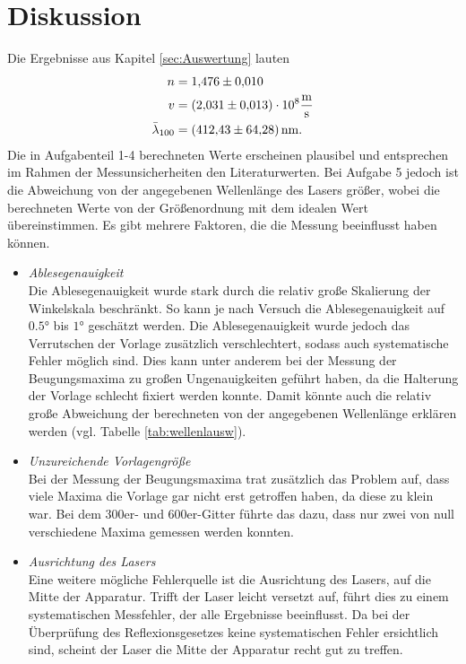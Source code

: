 \section{Diskussion}
\label{sec:Diskussion}
Die Ergebnisse aus Kapitel \ref{sec:Auswertung} lauten
\begin{align*}
    n &= \num{1.476 \pm 0.010} \\
    v &=(\num{2.031 \pm 0.013}) \cdot 10^8 \si{\metre\per\second}\\ 
    \bar{\lambda}_{100} &= \SI{412.43 \pm 64.28}{\nano\metre}.
\end{align*}
\noindent
Die in Aufgabenteil 1-4 berechneten Werte erscheinen plausibel und entsprechen im Rahmen der Messunsicherheiten
den Literaturwerten. Bei Aufgabe 5 jedoch ist die Abweichung von der angegebenen Wellenlänge des Lasers größer,
wobei die berechneten Werte von der Größenordnung mit dem idealen Wert übereinstimmen.
Es gibt mehrere Faktoren, die die Messung beeinflusst haben können.
\begin{itemize}
    \item \textit{Ablesegenauigkeit}
    \\\noindent
        Die Ablesegenauigkeit wurde stark durch die relativ große Skalierung der Winkelskala beschränkt.
        So kann je nach Versuch die Ablesegenauigkeit auf $\num{0.5}°$ bis $\num{1}°$ geschätzt werden.
        Die Ablesegenauigkeit wurde jedoch das Verrutschen der Vorlage zusätzlich verschlechtert, sodass
        auch systematische Fehler möglich sind. Dies kann unter anderem bei der Messung der Beugungsmaxima
        zu großen Ungenauigkeiten geführt haben, da die Halterung der Vorlage schlecht fixiert werden konnte.
        Damit könnte auch die relativ große Abweichung der berechneten von der angegebenen Wellenlänge
        erklären werden (vgl. Tabelle \ref{tab:wellenlausw}).
    \item \textit{Unzureichende Vorlagengröße}
    \\\noindent
        Bei der Messung der Beugungsmaxima trat zusätzlich das Problem auf, dass viele Maxima die Vorlage
        gar nicht erst getroffen haben, da diese zu klein war. Bei dem 300er- und 600er-Gitter führte das dazu,
        dass nur zwei von null verschiedene Maxima gemessen werden konnten.
    \item \textit{Ausrichtung des Lasers}
    \\\noindent
        Eine weitere mögliche Fehlerquelle ist die Ausrichtung des Lasers, auf die Mitte der Apparatur. Trifft
        der Laser leicht versetzt auf, führt dies zu einem systematischen Messfehler, der alle Ergebnisse
        beeinflusst. Da bei der Überprüfung des Reflexionsgesetzes keine systematischen Fehler ersichtlich sind,
        scheint der Laser die Mitte der Apparatur recht gut zu treffen.
\end{itemize}
